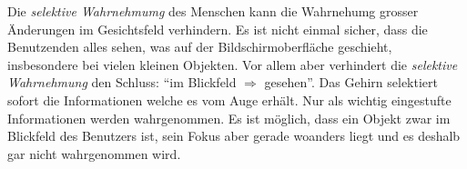 
Die \textit{selektive Wahrnehmumg} des Menschen kann die Wahrnehumg grosser Änderungen im Gesichtsfeld verhindern.
Es ist nicht einmal sicher, dass die Benutzenden alles sehen, was auf der Bildschirmoberfläche geschieht, 
insbesondere bei vielen kleinen Objekten.
Vor allem aber verhindert die \textit{selektive Wahrnehmung} den Schluss: 
\enquote{im Blickfeld $\Rightarrow$ gesehen}. 
Das Gehirn selektiert sofort die Informationen welche es vom Auge erhält. 
Nur als wichtig eingestufte Informationen werden wahrgenommen. 
Es ist möglich, dass ein Objekt zwar im Blickfeld des Benutzers ist, 
sein Fokus aber gerade woanders liegt und es deshalb gar nicht wahrgenommen wird.